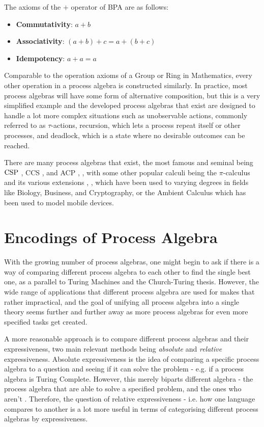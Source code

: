 \documentclass[../hons_project.tex]{subfiles}
\begin{document}
The axioms of the $+$ operator of BPA are as follows:
\begin{itemize}
    \item \textbf{Commutativity}: $a + b$
    \item \textbf{Associativity}: $(a + b) + c = a + (b + c)$
    \item \textbf{Idempotency}: $a + a = a$
\end{itemize}
Comparable to the operation axioms of a Group or Ring in Mathematics, every other operation in a process algebra is constructed similarly. In practice, most process algebras will have some form of alternative composition, but this is a very simplified example and the developed process algebras that exist are designed to handle a lot more complex situations such as unobservable actions, commonly referred to as $\tau$-actions, recursion, which lets a process repeat itself or other processes, and deadlock, which is a state where no desirable outcomes can be reached.

There are many process algebras that exist, the most famous and seminal being $\mathrm{CSP}$ \citep{brookesTheoryCommunicatingSequential1984}, CCS \citep{milnerCalculusCommunicatingSystems1980}, and ACP \citep{bergstraProcessAlgebraSynchronous1984}, \citep{bergstraACPtUniversalAxiom1989}, with some other popular calculi being the $\pi$-calculus and its various extensions  \citep{MILNER19921}, \citep{parrowFusionCalculusExpressiveness1998}, \citep{abadiCalculusCryptographicProtocols1999} which have been used to varying degrees in fields like Biology, Business, and Cryptography, or the Ambient Calculus \citep{cardelliMobileAmbients1998} which has been used to model mobile devices.

\section{Encodings of Process Algebra}

With the growing number of process algebras, one might begin to ask if there is a way of comparing different process algebra to each other to find the single best one, as a parallel to Turing Machines and the Church-Turing thesis. However, the wide range of applications that different process algebra are used for makes that rather impractical, and the goal of unifying all process algebra into a single theory seems further and further away as more process algebras for even more specified tasks get created.

A more reasonable approach is to compare different process algebras and their expressiveness, two main relevant methods being \textit{absolute} and \textit{relative} expressiveness.\citep{parrowExpressivenessProcessAlgebras2008} Absolute expressiveness is the idea of comparing a specific process algebra to a question and seeing if it can solve the problem - e.g. if a process algebra is Turing Complete. However, this merely biparts different algebra - the process algebra that are able to solve a specified problem, and the ones who aren't \citep{gorlaUnifiedApproachEncodability2010}. Therefore, the question of relative expressiveness - i.e. how one language compares to another is a lot more useful in terms of categorising different process algebras by expressiveness.
\end{document}
